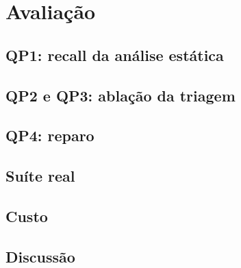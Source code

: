 \chapter{Avaliação}
\label{cap:avaliacao}


\section{QP1: recall da análise estática}
\pendente{}

\section{QP2 e QP3: ablação da triagem}

\section{QP4: reparo}
\pendente{}

\section{Suíte real}
\pendente{}

\section{Custo}
\pendente{}

\section{Discussão}
\pendente{}
